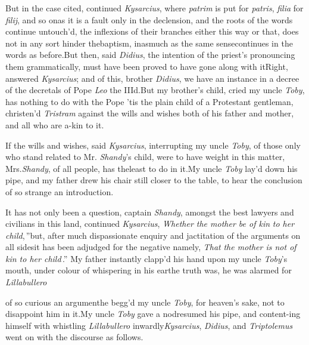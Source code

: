 \documentclass{article}
\begin{document}
But in the case cited, continued \textit{Kysarcius}, where
\textit{patrim} is put for \textit{patris}, \textit{filia}
for \textit{filij}, and so on\tsk as it is a fault only in
the declension, and the roots of the words continue
untouch’d, the inflexions of their branches either this way
or that, does not in any sort hinder the\pb baptism,
inasmuch as the same sense\break continues in the words as
before.\tsk But then, said \textit{Didius}, the intention of
the priest’s pronouncing them grammatically, must have been
proved to have gone along with it\tsk Right, answered
\textit{Kysarcius}; and of this, brother \textit{Didius}, we
have an instance in a decree of the decretals of Pope
\textit{Leo} the IIId.\tsk But my brother’s child, cried my
uncle \textit{Toby}, has nothing to do with the Pope\tsk
’tis the plain child of a Protestant gentleman, christen’d
\textit{Tristram} against the wills and wishes both of his
father and mother, and all who are a-kin to it.\tsk

If the wills and wishes, said \textit{Kysarcius}, interrupting my
uncle \textit{Toby}, of those only who stand related to Mr.
\textit{Shandy}’s child, were to have weight in this matter,
Mrs.\@ \textit{Shandy}, of all people, has the\pb least to do in
it.\tsk My uncle \textit{Toby} lay’d down his pipe, and my father drew his chair still closer to
the table, to hear the conclusion of so strange an
introduction.

It has not only been a question, captain \textit{Shandy}, amongst the
\lower-3pt\hbox{\ast} best lawyers and civilians in this land,
continued \textit{Kys\-arcius}, \lqq\textit{Whether the
mother be of kin}\break
\lqq \textit{to her child},\,”\tsk but, after much
dispas\-sionate enquiry and jactitation of the arguments on
all sides\tsk it has been adjudged for the negative\tsk
namely, \lqq\textit{That}\break
\lqq \textit{the mother is not of kin to her child}\,\dagger.”\break
My father instantly clapp’d his hand upon my uncle
\textit{Toby}’s mouth, under colour of whispering in his
ear\tsk the truth was, he was alarmed for
\textit{Lillabullero} \tsk{}\\[12pt]

\newpage\noindent
of so curious an argument\tsk he begg’d my
uncle \textit{Toby}, for heaven’s sake, not to disappoint him in it.\tsk My uncle
\textit{Toby} gave a nod\tsk resumed his pipe, and
content-\break ing himself with whistling
\textit{Lillabullero}\break
inwardly\tsh \textit{Kysarcius}, \textit{Didius}, and
\textit{Triptolemus} went on with the discourse as follows.
\end{document}
